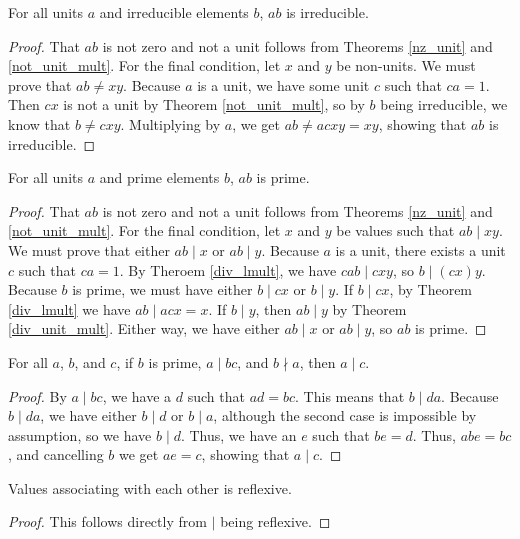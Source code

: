 \documentclass[../../math.tex]{subfiles}
\begin{document}
\begin{theorem} \label{irreducible_unit}
    For all units $a$ and irreducible elements $b$, $ab$ is irreducible.
\end{theorem}
\begin{proof}
    That $ab$ is not zero and not a unit follows from Theorems \ref{nz_unit} and
    \ref{not_unit_mult}.  For the final condition, let $x$ and $y$ be non-units.
    We must prove that $ab \neq xy$.  Because $a$ is a unit, we have some unit
    $c$ such that $ca = 1$.  Then $cx$ is not a unit by Theorem
    \ref{not_unit_mult}, so by $b$ being irreducible, we know that $b \neq cxy$.
    Multiplying by $a$, we get $ab \neq acxy = xy$, showing that $ab$ is
    irreducible.
\end{proof}

\begin{theorem} \label{prime_unit}
    For all units $a$ and prime elements $b$, $ab$ is prime.
\end{theorem}
\begin{proof}
    That $ab$ is not zero and not a unit follows from Theorems \ref{nz_unit} and
    \ref{not_unit_mult}.  For the final condition, let $x$ and $y$ be values
    such that $ab \mid xy$.  We must prove that either $ab \mid x$ or $ab \mid
    y$.  Because $a$ is a unit, there exists a unit $c$ such that $ca = 1$.  By
    Theroem \ref{div_lmult}, we have $cab \mid cxy$, so $b \mid (cx)y$.  Because
    $b$ is prime, we must have either $b \mid cx$ or $b \mid y$.  If $b \mid
    cx$, by Theorem \ref{div_lmult} we have $ab \mid acx = x$.  If $b \mid y$,
    then $ab \mid y$ by Theorem \ref{div_unit_mult}.  Either way, we have either
    $ab \mid x$ or $ab \mid y$, so $ab$ is prime.
\end{proof}

\begin{theorem} \label{prime_back}
    For all $a$, $b$, and $c$, if $b$ is prime, $a \mid bc$, and $b \nmid a$,
    then $a \mid c$.
\end{theorem}
\begin{proof}
    By $a \mid bc$, we have a $d$ such that $ad = bc$.  This means that $b \mid
    da$.  Because $b \mid da$, we have either $b \mid d$ or $b \mid a$, although
    the second case is impossible by assumption, so we have $b \mid d$.  Thus,
    we have an $e$ such that $be = d$.  Thus, $abe = bc$, and cancelling $b$ we
    get $ae = c$, showing that $a \mid c$.
\end{proof}

\begin{instance}
    Values associating with each other is reflexive.
\end{instance}
\begin{proof}
    This follows directly from $\mid$ being reflexive.
\end{proof}
\end{document}
